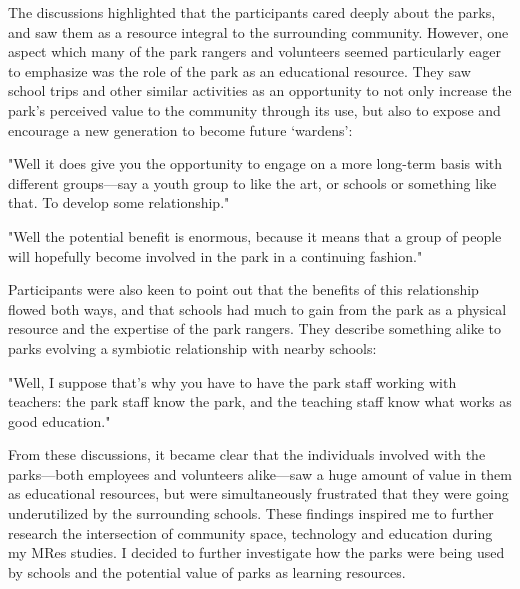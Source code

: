 The discussions highlighted that the participants cared deeply about the parks, and saw them as a resource integral to the surrounding community. However, one aspect which many of the park rangers and volunteers seemed particularly eager to emphasize was the role of the park as an educational resource. They saw school trips and other similar activities as an opportunity to not only increase the park’s perceived value to the community through its use, but also to expose and encourage a new generation to become future ‘wardens’:

\begin{displayquote}
"Well it does give you the opportunity to engage on a more long-term basis with different groups---say a youth group to like the art, or schools or something like that. To develop some relationship."
\end{displayquote}

\begin{displayquote}
"Well the potential benefit is enormous, because it means that a group of people will hopefully become involved in the park in a continuing fashion."
\end{displayquote}

Participants were also keen to point out that the benefits of this relationship flowed both ways, and that schools had much to gain from the park as a physical resource and the expertise of the park rangers. They describe something alike to parks evolving a symbiotic relationship with nearby schools:

\begin{displayquote}
"Well, I suppose that's why you have to have the park staff working with teachers: the park staff know the park, and the teaching staff know what works as good education."
\end{displayquote}

From these discussions, it became clear that the individuals involved with the parks---both employees and volunteers alike---saw a huge amount of value in them as educational resources, but were simultaneously frustrated that they were going underutilized by the surrounding schools. These findings inspired me to further research the intersection of community space, technology and education during my MRes studies. I decided to further investigate how the parks were being used by schools and the potential value of parks as learning resources.

